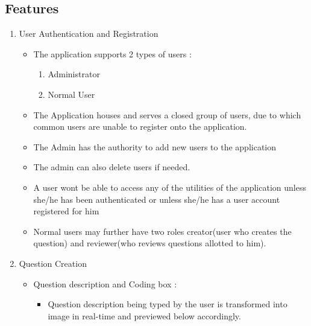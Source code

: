 \documentclass[a4paper,12pt,oneside]{book}
\begin{document}
\subsection{Features}
    \begin{enumerate}
      \item User Authentication and Registration
        \begin{itemize}
            \item The application supports 2 types of users :
                \begin{enumerate}
                    \item Administrator 
                    \item Normal User
                \end{enumerate}
           
           \item The Application houses and serves a closed group of users, due to which common users are unable to register onto the application. 
            
            \item The Admin has the authority to add new users to the application 
            
            \item The admin can also delete users if needed.
            
            \item A user wont be able to access any of the utilities of the application unless she/he has been authenticated or unless she/he has a user account registered for him 
            
            \item Normal users may further have two roles creator(user who creates the question) and reviewer(who reviews questions allotted to him).
            
            
           
            
            
            
            

        \end{itemize}
        
        \item Question Creation 
            \begin{itemize}
            
            \item Question description and Coding box : 
            
            \begin{itemize}
                \item Question description being typed by the user is transformed into image in real-time and previewed below accordingly.
                

\end{itemize}
\end{itemize}
\end{enumerate}
\end{document}
